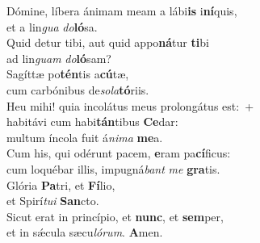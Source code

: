 \evenverse Dómine, líbera ánimam meam a lábi\textbf{is} i\textbf{ní}quis,~\*\\
\evenverse et a lin\textit{gua} \textit{do}\textbf{ló}sa.\\
\oddverse Quid detur tibi, aut quid appo\textbf{ná}tur \textbf{ti}bi~\*\\
\oddverse ad lin\textit{guam} \textit{do}\textbf{ló}sam?\\
\evenverse Sagíttæ po\textbf{tén}tis a\textbf{cú}tæ,~\*\\
\evenverse cum carbónibus de\textit{so}\textit{la}\textbf{tó}riis.\\
\oddverse Heu mihi! quia incolátus meus prolongátus est:~+\\
\oddverse  habitávi cum habi\textbf{tán}tibus \textbf{Ce}dar:~\*\\
\oddverse multum íncola fuit á\textit{ni}\textit{ma} \textbf{me}a.\\
\evenverse Cum his, qui odérunt pacem, \textbf{e}ram pa\textbf{cí}ficus:~\*\\
\evenverse cum loquébar illis, impugná\textit{bant} \textit{me} \textbf{gra}tis.\\
\oddverse Glória \textbf{Pa}tri, et \textbf{Fí}lio,~\*\\
\oddverse et Spirí\textit{tu}\textit{i} \textbf{San}cto.\\
\evenverse Sicut erat in princípio, et \textbf{nunc}, et \textbf{sem}per,~\*\\
\evenverse et in sǽcula sæcu\textit{ló}\textit{rum}. \textbf{A}men.\\
